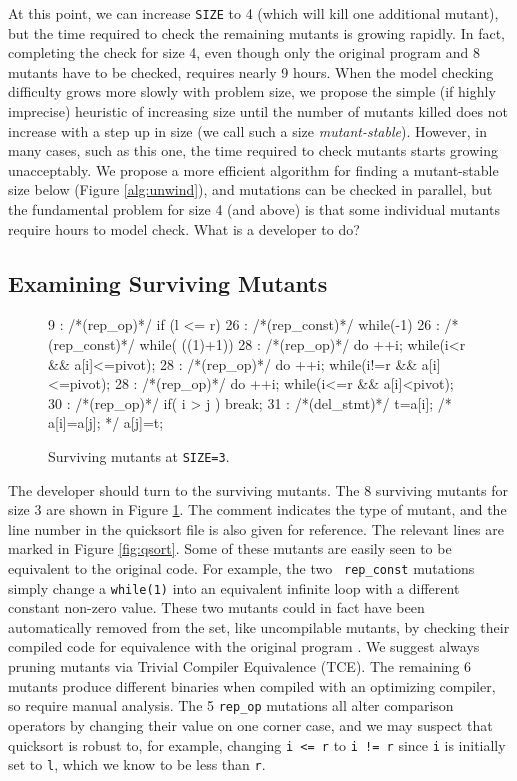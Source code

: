\documentclass{svjour3}
\begin{document}
At this point, we can increase {\tt SIZE} to 4 (which will kill one
additional mutant), but the time required to check the remaining
mutants is growing rapidly.  In fact, completing the check for size 4,
even though only the original program and 8 mutants have to be
checked, requires nearly 9 hours.  When the model checking
difficulty grows more slowly with problem size, we propose the simple
(if highly imprecise)
heuristic of increasing
size until the number of mutants killed does not increase with a step
up in size (we call such a size
\emph{mutant-stable}).  However, in
many cases, such as this one, the time required to check mutants
starts growing unacceptably.  We propose a more efficient algorithm
for finding a mutant-stable size below (Figure \ref{alg:unwind}), and
mutations can be checked in parallel, but the fundamental problem for
size 4 (and above) is that some individual mutants require hours to
model check.  What is a developer to do?


\subsection{Examining Surviving Mutants}
\label{sec:maxcover}


\begin{figure}
{\scriptsize
\begin{code}
 9 :   /*(rep\_op)*/ if (l <= r) 
 26 :  /*(rep\_const)*/ while(-1)
 26 :  /*(rep\_const)*/ while( ((1)+1))
 28 :  /*(rep\_op)*/ do ++i; while(i<r \&\& a[i]<=pivot);
 28 :  /*(rep\_op)*/ do ++i; while(i!=r \&\& a[i]<=pivot);
 28 :  /*(rep\_op)*/ do ++i; while(i<=r \&\& a[i]<pivot);
 30 :  /*(rep\_op)*/ if( i > j ) break;
 31 :  /*(del\_stmt)*/ t=a[i]; /*  a[i]=a[j]; */  a[j]=t;
\end{code}
}
\caption{Surviving mutants at {\tt SIZE=3}.}
\label{fig:survivors}
\end{figure}

The developer should turn to the surviving mutants.  The 8 surviving  
mutants for size 3 are shown in Figure \ref{fig:survivors}.  
The comment indicates the type of mutant, and the line number in the quicksort file is also given for reference.  The relevant lines are marked
in Figure \ref{fig:qsort}.  Some of these mutants are easily seen to
be equivalent to the original code.  For example, the two {\tt
  rep\_const} mutations simply change a {\tt while(1)} into an
equivalent infinite loop with a different constant non-zero value.
These two mutants could in fact have been automatically removed from
the set, like uncompilable mutants, by checking their compiled code
for equivalence with the original program \cite{TCE}.  We suggest
always pruning mutants via Trivial Compiler Equivalence (TCE).  The remaining 6 mutants produce different
binaries when compiled with an optimizing compiler, so require manual
analysis.  The 5 {\tt rep\_op} mutations all alter comparison
operators by changing their value on one corner case, and we may suspect that quicksort is robust to,
for example, changing {\tt i <= r} to {\tt i != r} since {\tt i} is
initially set to {\tt l}, which we know to be less than {\tt r}.
\end{document}
